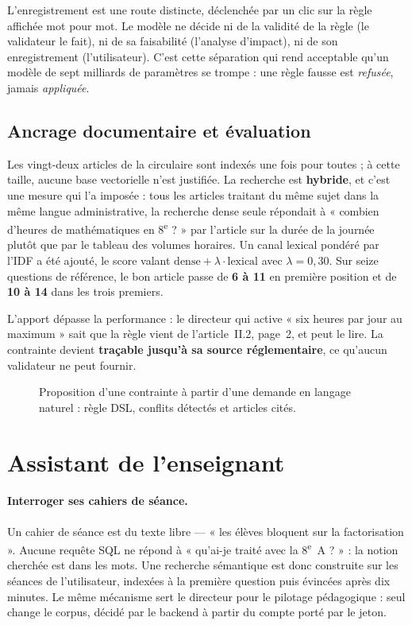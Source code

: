 L'enregistrement est une route distincte, déclenchée par un clic sur la règle
affichée mot pour mot. Le modèle ne décide ni de la validité de la règle (le
validateur le fait), ni de sa faisabilité (l'analyse d'impact), ni de son
enregistrement (l'utilisateur). C'est cette séparation qui rend acceptable
qu'un modèle de sept milliards de paramètres se trompe : une règle fausse est
\emph{refusée}, jamais \emph{appliquée}.

\subsection{Ancrage documentaire et évaluation}

Les vingt-deux articles de la circulaire sont indexés une fois pour toutes ;
à cette taille, aucune base vectorielle n'est justifiée. La recherche est
\textbf{hybride}, et c'est une mesure qui l'a imposée : tous les articles
traitant du même sujet dans la même langue administrative, la recherche dense
seule répondait à « combien d'heures de mathématiques en
8\textsuperscript{e} ? » par l'article sur la durée de la journée plutôt que
par le tableau des volumes horaires. Un canal lexical pondéré par l'IDF a été
ajouté, le score valant $\text{dense} + \lambda \cdot \text{lexical}$ avec
$\lambda = 0{,}30$. Sur seize questions de référence, le bon article passe de
\textbf{6 à 11} en première position et de \textbf{10 à 14} dans les trois
premiers.

L'apport dépasse la performance : le directeur qui active « six heures par jour
au maximum » sait que la règle vient de l'article~II.2, page~2, et peut le
lire. La contrainte devient \textbf{traçable jusqu'à sa source réglementaire},
ce qu'aucun validateur ne peut fournir.

\begin{figure}[htbp]
  \centering
  \caption{Proposition d'une contrainte à partir d'une demande en langage
  naturel : règle DSL, conflits détectés et articles cités.}
  \label{fig:ch4-contraintes}
\end{figure}

\section{Assistant de l'enseignant}

\paragraph{Interroger ses cahiers de séance.} Un cahier de séance est du texte
libre — « les élèves bloquent sur la factorisation ». Aucune requête SQL ne
répond à « qu'ai-je traité avec la 8\textsuperscript{e}~A ? » : la notion
cherchée est dans les mots. Une recherche sémantique est donc construite sur
les séances de l'utilisateur, indexées à la première question puis évincées
après dix minutes. Le même mécanisme sert le directeur pour le pilotage
pédagogique : seul change le corpus, décidé par le backend à partir du compte
porté par le jeton.

